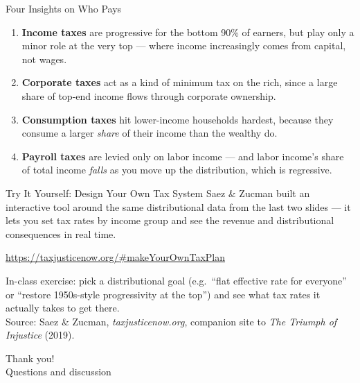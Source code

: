 \documentclass[11pt,aspectratio=169]{beamer}
\newcommand{\srcnote}[1]{{\footnotesize\color{wugray}Source: #1}}
\begin{document}
\begin{frame}{Four Insights on Who Pays}
 
  \begin{enumerate}
    \setlength{\itemsep}{1pt}
    \item \textbf{Income taxes} are progressive for the bottom 90\% of earners, but play only a minor role at the very top --- where income increasingly comes from capital, not wages.
    \item \textbf{Corporate taxes} act as a kind of minimum tax on the rich, since a large share of top-end income flows through corporate ownership.
    \item \textbf{Consumption taxes} hit lower-income households hardest, because they consume a larger \emph{share} of their income than the wealthy do.
    \item \textbf{Payroll taxes} are levied only on labor income --- and labor income's share of total income \emph{falls} as you move up the distribution, which is regressive.
  \end{enumerate}

\end{frame}

\begin{frame}[fragile]{Try It Yourself: Design Your Own Tax System}
  \small
  Saez \& Zucman built an interactive tool around the same distributional data from the last two slides --- it lets you set tax rates by income group and see the revenue and distributional consequences in real time.
  \vspace{0.5em}
  \begin{center}
    \Large \url{https://taxjusticenow.org/#makeYourOwnTaxPlan}
  \end{center}
  \vspace{0.5em}
  \centering
  \alert{In-class exercise:} pick a distributional goal (e.g.\ ``flat effective rate for everyone'' or ``restore 1950s-style progressivity at the top'') and see what tax rates it actually takes to get there.\\
  \srcnote{Saez \& Zucman, \emph{taxjusticenow.org}, companion site to \emph{The Triumph of Injustice} (2019).}
\end{frame}





\begin{frame}[standout]
  Thank you!\\
  \vspace{0.5em}
  \small Questions and discussion
\end{frame}
\end{document}
